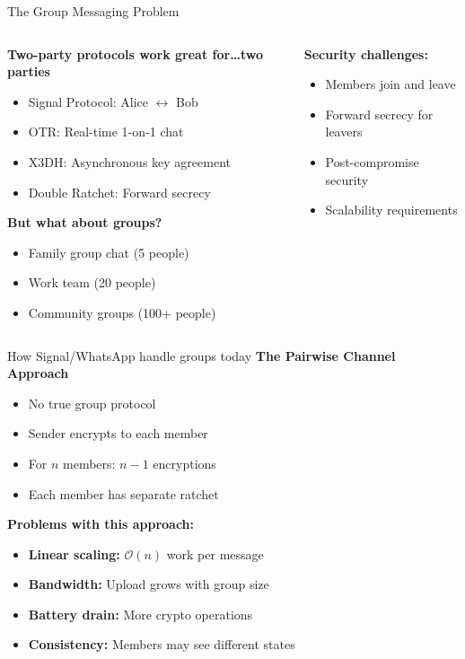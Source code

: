 \documentclass[aspectratio=169, lualatex, handout]{beamer}
\begin{document}
\begin{frame}{The Group Messaging Problem}
	\begin{columns}[c]
		\begin{column}{0.5\textwidth}
			\textbf{Two-party protocols work great for\ldots two parties}
			\begin{itemize}
				\item Signal Protocol: Alice $\leftrightarrow$ Bob
				\item OTR: Real-time 1-on-1 chat
				\item X3DH: Asynchronous key agreement
				\item Double Ratchet: Forward secrecy
			\end{itemize}
			\textbf{But what about groups?}
			\begin{itemize}
				\item Family group chat (5 people)
				\item Work team (20 people)
				\item Community groups (100+ people)
			\end{itemize}
		\end{column}
		\begin{column}{0.5\textwidth}
			\textbf{Security challenges:}
			\begin{itemize}
				\item Members join and leave
				\item Forward secrecy for leavers
				\item Post-compromise security
				\item Scalability requirements
			\end{itemize}
		\end{column}
	\end{columns}
\end{frame}

\begin{frame}{How Signal/WhatsApp handle groups today}
	\textbf{The Pairwise Channel Approach}
	\begin{itemize}
		\item No true group protocol
		\item Sender encrypts to each member
		\item For $n$ members: $n-1$ encryptions
		\item Each member has separate ratchet
	\end{itemize}
	\textbf{Problems with this approach:}
	\begin{itemize}
		\item \textbf{Linear scaling:} $\mathcal{O}(n)$ work per message
		\item \textbf{Bandwidth:} Upload grows with group size
		\item \textbf{Battery drain:} More crypto operations
		\item \textbf{Consistency:} Members may see different states
	\end{itemize}
\end{frame}
\end{document}
